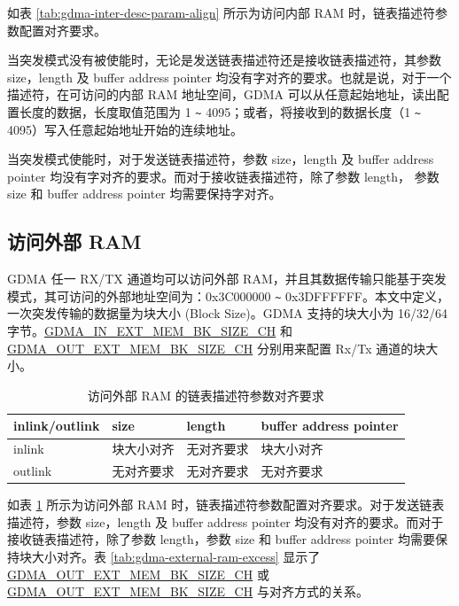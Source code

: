 \documentclass[main\_\_CN.tex]{subfiles}
\begin{document}
如表 \ref{tab:gdma-inter-desc-param-align} 所示为访问内部 RAM 时，链表描述符参数配置对齐要求。

当突发模式没有被使能时，无论是发送链表描述符还是接收链表描述符，其参数 size，length 及 buffer address pointer 均没有字对齐的要求。也就是说，对于一个描述符，在可访问的内部 RAM 地址空间，GDMA 可以从任意起始地址，读出配置长度的数据，长度取值范围为 1 \verb+~+ 4095；或者，将接收到的数据长度（1 \verb+~+ 4095）写入任意起始地址开始的连续地址。

当突发模式使能时，对于发送链表描述符，参数 size，length 及 buffer address pointer 均没有字对齐的要求。而对于接收链表描述符，除了参数 length， 参数 size 和 buffer address pointer 均需要保持字对齐。


\subsection{访问外部 RAM}\label{sec:dma-access-exter-ram}
GDMA 任一 RX/TX 通道均可以访问外部 RAM，并且其数据传输只能基于突发模式，其可访问的外部地址空间为：0x{}3C000000 \verb+~+ 0x{}3DFFFFFF。本文中定义，一次突发传输的数据量为块大小 (Block Size)。GDMA 支持的块大小为 16/32/64 字节。\hyperref[fielddesc:DMAINEXTMEMBKSIZECHN]{GDMA\_IN\_EXT\_MEM\_BK\_SIZE\_CH} 和 \hyperref[fielddesc:DMAOUTEXTMEMBKSIZECHN]{GDMA\_OUT\_EXT\_MEM\_BK\_SIZE\_CH} 分别用来配置 Rx/Tx 通道的块大小。

\begin{longtable}[c]{ | l | l | l | l | }
    \caption{访问外部 RAM 的链表描述符参数对齐要求}
    \label{tab:gdma-exter-desc-param-align}
    \\\hline
    \rowcolor{lightgray}
    \textbf{inlink/outlink} & \textbf{size} & \textbf{length} & \textbf{buffer address pointer} \\\hline

    inlink  & 块大小对齐 & 无对齐要求  & 块大小对齐 \\\hline
    outlink & 无对齐要求 & 无对齐要求  & 无对齐要求 \\\hline
\end{longtable}

如表 \ref{tab:gdma-exter-desc-param-align} 所示为访问外部 RAM 时，链表描述符参数配置对齐要求。对于发送链表描述符，参数 size，length 及 buffer address pointer 均没有对齐的要求。而对于接收链表描述符，除了参数 length，参数 size 和 buffer address pointer 均需要保持块大小对齐。表 \ref{tab:gdma-external-ram-excess} 显示了 \hyperref[fielddesc:DMAOUTEXTMEMBKSIZECHN]{GDMA\_OUT\_EXT\_MEM\_BK\_SIZE\_CH} 或 \hyperref[fielddesc:DMAOUTEXTMEMBKSIZECHN]{GDMA\_OUT\_EXT\_MEM\_BK\_SIZE\_CH} 与对齐方式的关系。
\end{document}
